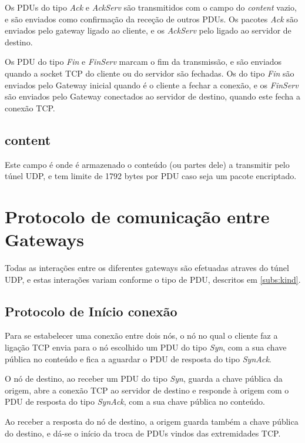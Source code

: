 \documentclass[a4paper]{report}
\begin{document}
Os PDUs do tipo \textit{Ack} e \textit{AckServ} são transmitidos com o 
campo do \textit{content} vazio, e são enviados como confirmação da 
receção de outros PDUs. Os pacotes \textit{Ack} são enviados pelo gateway ligado
ao cliente, e os \textit{AckServ} pelo ligado ao servidor de destino.

Os PDU do tipo \textit{Fin} e \textit{FinServ} marcam o fim da transmissão,
e são enviados quando a socket TCP do cliente ou do servidor são fechadas.
Os do tipo \textit{Fin} são enviados pelo Gateway inicial quando é o 
cliente a fechar a conexão, e os \textit{FinServ} são enviados pelo Gateway
conectados ao servidor de destino, quando este fecha a conexão TCP.

\subsection{content}

Este campo é onde é armazenado o conteúdo (ou partes dele) a transmitir pelo
túnel UDP, e tem limite de 1792 bytes por PDU caso seja um pacote encriptado.

\section{Protocolo de comunicação entre Gateways}

Todas as interações entre os diferentes gateways são efetuadas atraves do túnel
UDP, e estas interações variam conforme o tipo de PDU, descritos em 
\ref{subs:kind}.

\subsection{Protocolo de Início conexão}

Para se estabelecer uma conexão entre dois nós, o nó no qual o cliente
faz a ligação TCP envia para o nó escolhido um PDU do tipo \textit{Syn},
com a sua chave pública no conteúdo e fica a aguardar o PDU de resposta 
do tipo \textit{SynAck}.

O nó de destino, ao receber um PDU do tipo \textit{Syn}, guarda
a chave pública da origem, abre a conexão TCP ao servidor de destino e
responde à origem com o PDU de resposta do tipo \textit{SynAck}, com a sua
chave pública no conteúdo.

Ao receber a resposta do nó de destino, a origem guarda também a chave
pública do destino, e dá-se o início da troca de PDUs vindos das 
extremidades TCP.
\end{document}
